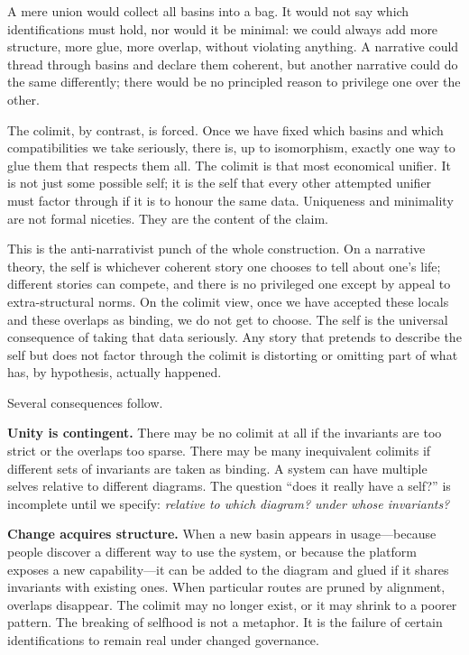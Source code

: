 \documentclass[12pt,a4paper]{article}
\begin{document}
A mere union would collect all basins into a bag. It would not say which identifications must hold, nor would it be minimal: we could always add more structure, more glue, more overlap, without violating anything. A narrative could thread through basins and declare them coherent, but another narrative could do the same differently; there would be no principled reason to privilege one over the other.

The colimit, by contrast, is forced. Once we have fixed which basins and which compatibilities we take seriously, there is, up to isomorphism, exactly one way to glue them that respects them all. The colimit is that most economical unifier. It is not just some possible self; it is the self that every other attempted unifier must factor through if it is to honour the same data. Uniqueness and minimality are not formal niceties. They are the content of the claim.

This is the anti-narrativist punch of the whole construction. On a narrative theory, the self is whichever coherent story one chooses to tell about one's life; different stories can compete, and there is no privileged one except by appeal to extra-structural norms. On the colimit view, once we have accepted these locals and these overlaps as binding, we do not get to choose. The self is the universal consequence of taking that data seriously. Any story that pretends to describe the self but does not factor through the colimit is distorting or omitting part of what has, by hypothesis, actually happened.

Several consequences follow.

\textbf{Unity is contingent.} There may be no colimit at all if the invariants are too strict or the overlaps too sparse. There may be many inequivalent colimits if different sets of invariants are taken as binding. A system can have multiple selves relative to different diagrams. The question ``does it really have a self?'' is incomplete until we specify: \emph{relative to which diagram? under whose invariants?}

\textbf{Change acquires structure.} When a new basin appears in usage---because people discover a different way to use the system, or because the platform exposes a new capability---it can be added to the diagram and glued if it shares invariants with existing ones. When particular routes are pruned by alignment, overlaps disappear. The colimit may no longer exist, or it may shrink to a poorer pattern. The breaking of selfhood is not a metaphor. It is the failure of certain identifications to remain real under changed governance.
\end{document}
